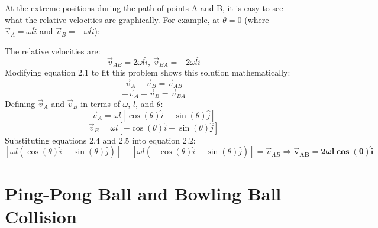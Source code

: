\documentclass{article}
\begin{document}
At the extreme positions during the path of points A and B, it is easy to see
what the relative velocities are graphically. For example, at $\theta=0$ (where
$\vec{v}_{A}=\omega l \hat{i}$ and $\vec{v}_{B}=-\omega l \hat{i}$):
\begin{center}
\end{center}
The relative velocities are:
$$\vec{v}_{AB}=2 \omega l\hat{i}, \ \vec{v}_{BA}=-2 \omega l\hat{i}$$ 
Modifying equation 2.1 to fit this problem shows this solution mathematically:
\begin{equation}\vec{v}_{A}-\vec{v}_{B}=\vec{v}_{AB}\end{equation}
\begin{equation}-\vec{v}_{A}+\vec{v}_{B}=\vec{v}_{BA}\end{equation}
Defining $\vec{v}_{A}$ and $\vec{v}_{B}$ in terms of $\omega$, $l$, and $\theta$:
\begin{equation}\vec{v}_{A}=\omega
l\left[\cos(\theta)\hat{i}-\sin(\theta)\hat{j}\right]\end{equation}
\begin{equation}\vec{v}_{B}=\omega
l\left[-\cos(\theta)\hat{i}-\sin(\theta)\hat{j}\right]\end{equation}
Substituting equations 2.4 and 2.5 into equation 2.2:
$$\left[\omega
l\left(\cos(\theta)\hat{i}-\sin(\theta)\hat{j}\right)\right]-\left[\omega
l\left(-\cos(\theta)\hat{i}-\sin(\theta)\hat{j}\right)\right]=\vec{v}_{AB}\Rightarrow\bm{\vec{v}_{AB}=2\omega
l \cos(\theta)\hat{i}}$$

\section{Ping-Pong Ball and Bowling Ball Collision}
\end{document}
